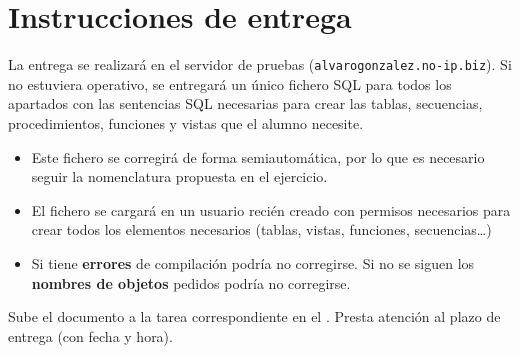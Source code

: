 \section{Instrucciones de entrega}
La entrega se realizará en el servidor de pruebas (\texttt{alvarogonzalez.no-ip.biz}). Si no estuviera operativo, se entregará un único fichero SQL para todos los apartados con las sentencias SQL necesarias para crear las tablas, secuencias, procedimientos, funciones y vistas que el alumno necesite.
\begin{itemize}
\item Este fichero se corregirá de forma semiautomática, por lo que es necesario seguir la nomenclatura propuesta en el ejercicio.
\item El fichero se cargará en un usuario recién creado con permisos necesarios para crear todos los elementos necesarios (tablas, vistas, funciones, secuencias\dots)
\item Si tiene \textbf{errores} de compilación podría no corregirse. Si no se siguen los \textbf{nombres de objetos} pedidos podría no corregirse.
\end{itemize}


Sube el documento a la tarea correspondiente en el .
Presta atención al plazo de entrega (con fecha y hora).







